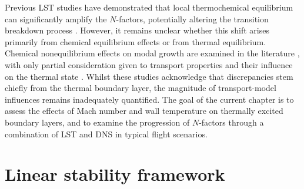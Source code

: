 Previous \gls{LST} studies have demonstrated that local thermochemical equilibrium can significantly amplify the $N$-factors, potentially altering the transition breakdown process \citep{MiroMiro2019}. However, it remains unclear whether this shift arises primarily from chemical equilibrium effects or from thermal equilibrium. Chemical nonequilibrium effects on modal growth are examined in the literature \citep{FrankoMacCormackLele2010}, with only partial consideration given to transport properties and their influence on the thermal state \citep{LyttleReed2005}. Whilst these studies acknowledge that discrepancies stem chiefly from the thermal boundary layer, the magnitude of transport-model influences remains inadequately quantified. The goal of the current chapter is to assess the effects of Mach number and wall temperature on thermally excited boundary layers, and to examine the progression of $N$-factors through a combination of \gls{LST} and \gls{DNS} in typical flight scenarios.




\section{Linear stability framework}



